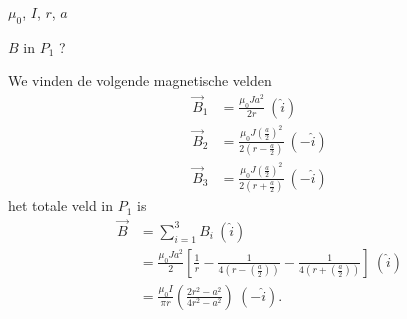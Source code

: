     \begin{minipage}[t]{.48\textwidth}
        \begin{description}[labelwidth=1.5cm, leftmargin=!]
            \item[Geg. :]  $\mu_0$, $I$, $r$, $a$
            \item[Gevr. :] $B$ in $P_1$ ?
            \item[Opl. :]  
            We vinden de volgende magnetische velden
            \begin{align*}
                \vec{B}_1 
                    &= \frac{\mu_0Ja^2}{2r} \ (\hat{i}) \\
                \vec{B}_2
                    &= \frac{\mu_0J(\frac{a}{2})^2}{2\left(r - \frac{a}{2}\right)} \ (-\hat{i}) \\
                \vec{B}_3 
                    &= \frac{\mu_0J(\frac{a}{2})^2}{2\left(r + \frac{a}{2}\right)} \ (-\hat{i})
            \end{align*}
            het totale veld in $P_1$ is
            \begin{align*}
                \vec{B} 
                    &= \sum_{i=1}^3 B_i \ (\hat{i}) \\
                    &= \frac{\mu_0Ja^2}{2} \left[\frac{1}{r} - \frac{1}{4\left(r - \left(\frac{a}{2}\right)\right)} - \frac{1}{4\left(r + \left(\frac{a}{2}\right)\right)} \right] \ (\hat{i}) \\
                    &= \frac{\mu_0I}{\pi r}\left(\frac{2r^2-a^2}{4r^2-a^2}\right) \ (-\hat{i}).
            \end{align*}
        \end{description}    
    \end{minipage}%
